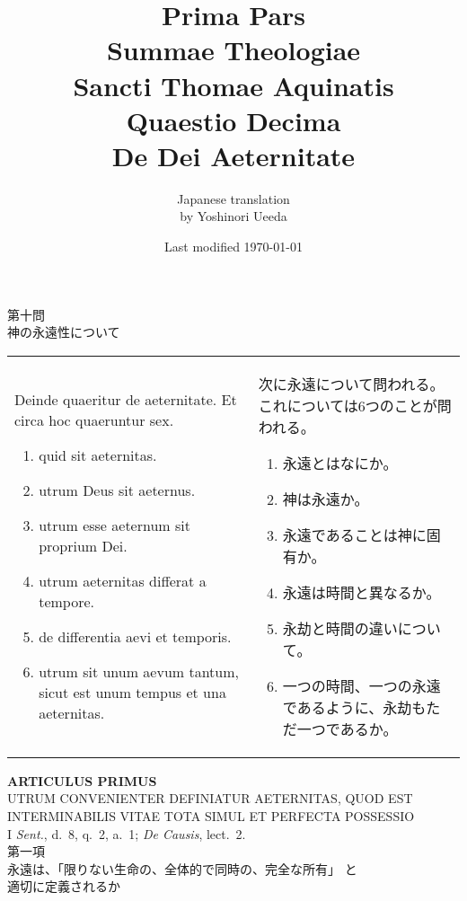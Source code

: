 \documentclass[10pt]{jsarticle} %
\title{{\bf Prima Pars}\\{\HUGE Summae Theologiae}\\Sancti Thomae
Aquinatis\\Quaestio Decima\\{\bf De Dei Aeternitate}}
\author{Japanese translation\\by Yoshinori {\sc Ueeda}}
\date{Last modified \today}
\begin{document}
\maketitle
\begin{center}
{\Large 第十問\\神の永遠性について}
\end{center}


\begin{longtable}{p{21em}p{21em}}
Deinde quaeritur de aeternitate. Et circa hoc quaeruntur sex. 
\begin{enumerate}
 \item quid sit aeternitas.
 \item utrum Deus sit aeternus.
 \item utrum esse aeternum sit proprium Dei. 
 \item utrum aeternitas differat a tempore.
 \item de differentia aevi et temporis. 
 \item utrum sit unum aevum tantum, sicut est unum tempus et una
       aeternitas.
\end{enumerate}

&

次に永遠について問われる。これについては6つのことが問われる。
\begin{enumerate}
 \item 永遠とはなにか。
 \item 神は永遠か。
 \item 永遠であることは神に固有か。
 \item 永遠は時間と異なるか。
 \item 永劫と時間の違いについて。
 \item 一つの時間、一つの永遠であるように、永劫もただ一つであるか。
\end{enumerate}
\end{longtable}

\newpage
{}

\begin{center}
 {\Large {\bf ARTICULUS PRIMUS}}\\
 {\large UTRUM CONVENIENTER DEFINIATUR AETERNITAS, QUOD EST
 INTERMINABILIS VITAE TOTA SIMUL ET PERFECTA POSSESSIO}\\
 {\footnotesize I {\itshape Sent.}, d.~8, q.~2, a.~1; {\itshape De
 Causis}, lect.~2.}\\
 {\Large 第一項\\永遠は、「限りない生命の、全体的で同時の、完全な所有」
 と\\適切に定義されるか}
\end{center}
\end{document}
